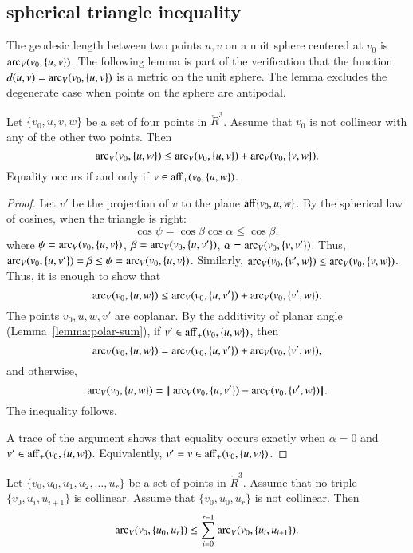 \subsection{spherical triangle inequality}

The geodesic length between two points
$u,v$ on a unit sphere centered at $v_0$ is $\operatorname{arc}_V(v_0,\{u,v\})$.
The following lemma is part of the verification that
the function $d(u,v) = \operatorname{arc}_V(v_0,\{u,v\})$ is a metric
on the unit sphere.  The lemma excludes the degenerate case when
points on the sphere are antipodal.

\begin{lemma}\label{lemma:sph-tri-ineq}
Let $\{v_0,u,v,w\}$ be a set of four points in $\ring{R}^3$.
Assume that $v_0$ is not collinear with any of the other two points.
Then
   $$
   \operatorname{arc}_V(v_0,\{u,w\}) \le \operatorname{arc}_V(v_0,\{u,v\}) + \operatorname{arc}_V(v_0,\{v,w\}).
   $$
Equality occurs if and only if $v\in{\operatorname{aff}}_+(v_0,\{u,w\})$.
\end{lemma}

\begin{proof} Let $v'$ be the projection of $v$ to the plane
${\operatorname{aff}}\{v_0,u,w\}$.  
By the spherical law of cosines, when the triangle is right:
   $$
   \cos\psi = \cos\beta\cos\alpha \le \cos\beta,
   $$
where $\psi = \operatorname{arc}_V(v_0,\{u,v\})$, $\beta = \operatorname{arc}_V(v_0,\{u,v'\})$, $\alpha=\operatorname{arc}_V(v_0,\{v,v'\})$.
Thus, $\operatorname{arc}_V(v_0,\{u,v'\})=\beta\le \psi=\operatorname{arc}_V(v_0,\{u,v\})$.
Similarly, $\operatorname{arc}_V(v_0,\{v',w\}) \le \operatorname{arc}_V(v_0,\{v,w\})$.
Thus, it is enough to show that 
  $$
  \operatorname{arc}_V(v_0,\{u,w\}) \le \operatorname{arc}_V(v_0,\{u,v'\}) + \operatorname{arc}_V(v_0,\{v',w\}).
  $$
The points $v_0,u,w,v'$ are coplanar.
By the additivity of planar angle (Lemma~\ref{lemma:polar-sum}), if 
$v'\in {\operatorname{aff}}_+(v_0,\{u,w\})$, then
   $$
   \operatorname{arc}_V(v_0,\{u,w\}) = \operatorname{arc}_V(v_0,\{u,v'\}) + \operatorname{arc}_V(v_0,\{v',w\}),   
   $$
and otherwise,
   $$
   \operatorname{arc}_V(v_0,\{u,w\}) = {\hskip0.1em|\hskip-0.15em|\hskip0.1em}\operatorname{arc}_V(v_0,\{u,v'\})  -  \operatorname{arc}_V(v_0,\{v',w\}){\hskip0.1em|\hskip-0.15em|\hskip0.1em}.
   $$
The inequality follows.

A trace of the argument shows that equality occurs exactly when
$\alpha=0$ and $v'\in {\operatorname{aff}}_+(v_0,\{u,w\})$.  Equivalently,
$v'=v\in{\operatorname{aff}}_+(v_0,\{u,w\})$.
\end{proof}

\begin{lemma}
\label{lemma:sph-tri-multi}
Let $\{v_0,u_0,u_1,u_2,\ldots,u_r\}$ be a set of points in $\ring{R}^3$.
Assume that no triple $\{v_0,u_i,u_{i+1}\}$ is collinear.  Assume
that $\{v_0,u_0,u_r\}$ is not collinear.  Then
$$
  \operatorname{arc}_V(v_0,\{u_0,u_r\}) \le \sum_{i=0}^{r-1} \operatorname{arc}_V(v_0,\{u_i,u_{i+1}\}).
$$
\end{lemma}

